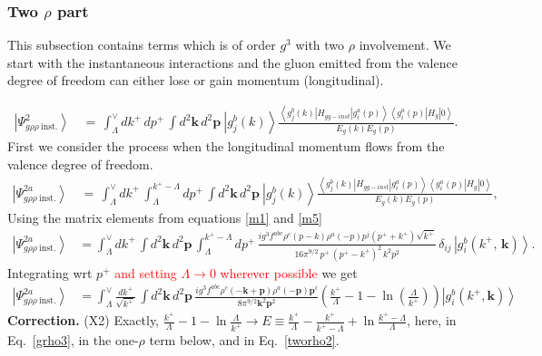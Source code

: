 \documentclass[aps,prd,amsmath,amssymb,nofootinbib]{revtex4-2}
\numberwithin{equation}{section}
\begin{document}
\subsubsection{Two $\rho$ part}
This subsection contains terms which is of order $g^{3}$ with two $\rho$ involvement. We start with the instantaneous interactions and the gluon emitted from the valence degree of freedom can either lose or gain momentum (longitudinal). 
\begin{figure}[h]
    \label{fig:4}
\end{figure}
\begin{align}\label{koa}
\left|\Psi_{g\rho\rho\:\text{inst.}}^{2}\right\rangle \,& = \,\int_{\Lambda}^{\vee}dk^{+}\,dp^{+}\,\int d^{2}\mathbf{k}\,d^{2}\mathbf{p}\:\left|g_{j}^{b}(k)\right\rangle \frac{\left\langle g_{j}^{b}(k)\left|H_{gg-inst}\right|g_{i}^{a}(p)\right\rangle \left\langle g_{i}^{a}(p)\left|H_{g}\right|0\right\rangle }{E_{g}(k)E_{g}(p)}.
\end{align}
First we consider the process when the longitudinal momentum flows from the valence degree of freedom.
\begin{align}\label{gthreed}
\left|\Psi_{g\rho\rho\:\text{inst.}}^{2a}\right\rangle \,& = \,\int_{\Lambda}^{\vee}dk^{+}\,\int_{\Lambda}^{k^{+}-\Lambda}dp^{+}\,\int d^{2}\mathbf{k}\, d^{2}\mathbf{p}\:\left|g_{j}^{b}(k)\right\rangle \frac{\left\langle g_{j}^{b}(k)\left|H_{gg-inst}\right|g_{i}^{a}(p)\right\rangle \left\langle g_{i}^{a}(p)\left|H_{g}\right|0\right\rangle }{E_{g}(k)E_{g}(p)},
\end{align}
Using the matrix elements from equations \eqref{m1} and  \eqref{m5}
\begin{align}\label{instgg}
\left|\Psi_{g\rho\rho\:\text{inst.}}^{2a}\right\rangle & =\int_{\Lambda}^{\vee}dk^{+}\,\int d^{2}\mathbf{k}\, d^{2}\mathbf{p}\,\int_{\Lambda}^{k^{+}-\Lambda} dp^{+}\, \frac{ig^{3}f^{abc}\rho^{c}(p-k)\rho^{a}(-p)p^{j}(p^{+}+k^{+})\sqrt{k^{+}}}{16\pi^{9/2}\, p^{+}\,(p^{+}-k^{+})^{2}\, k^{2}p^{2}}\,\delta_{ij}\,\left|g_{i}^{b}( k^{+},\,\mathbf{k})\right\rangle.
\end{align}
Integrating wrt $p^{+}$ \textcolor{red}{and setting $\Lambda \rightarrow 0$ wherever possible} we get
\begin{align}
  \left|\Psi_{g\rho\rho\:\text{inst.}}^{2a}\right\rangle & =  \int_{\Lambda}^{\vee}\frac{dk^{+}}{\sqrt{k^{+}}}\,\int d^{2}\mathbf{k}\, d^{2}\mathbf{p}\,\frac{ig^{3}f^{abc}\rho^{c}(-\mathbf{k}+\mathbf{p})\rho^{a}(-\mathbf{p})\mathbf{p}^{i}}{8\pi^{9/2} \mathbf{k}^{2}\mathbf{p}^{2}}\left(\frac{k^{+}}{\Lambda}-1-\ln\left(\frac{\Lambda}{k^{+}}\right)\right)\left|g_{i}^{b}(k^{+},\mathbf{k})\right\rangle
\end{align}
{\color{blue}\noindent\textbf{Correction.} (X2) Exactly, $\frac{k^{+}}{\Lambda}-1-\ln\frac{\Lambda}{k^{+}}\to E\equiv\frac{k^{+}}{\Lambda}-\frac{k^{+}}{k^{+}-\Lambda}+\ln\frac{k^{+}-\Lambda}{\Lambda}$, here, in Eq.~\eqref{grho3}, in the one-$\rho$ term below, and in Eq.~\eqref{tworho2}.}
\end{document}
